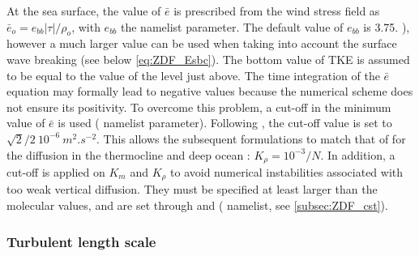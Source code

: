 \documentclass[../main/NEMO_manual]{subfiles}
\begin{document}
At the sea surface, the value of $\bar{e}$ is prescribed from the wind stress field as
$\bar{e}_o = e_{bb} |\tau| / \rho_o$, with $e_{bb}$ the  namelist parameter.
The default value of $e_{bb}$ is 3.75. \citep{gaspar.gregoris.ea_JGR90}), however a much larger value can be used when
taking into account the surface wave breaking (see below \autoref{eq:ZDF_Esbc}).
The bottom value of TKE is assumed to be equal to the value of the level just above.
The time integration of the $\bar{e}$ equation may formally lead to negative values because
the numerical scheme does not ensure its positivity.
To overcome this problem, a cut-off in the minimum value of $\bar{e}$ is used ( namelist parameter).
Following \citet{gaspar.gregoris.ea_JGR90}, the cut-off value is set to $\sqrt{2}/2~10^{-6}~m^2.s^{-2}$.
This allows the subsequent formulations to match that of \citet{gargett_JMR84} for the diffusion in
the thermocline and deep ocean :  $K_\rho = 10^{-3} / N$.
In addition, a cut-off is applied on $K_m$ and $K_\rho$ to avoid numerical instabilities associated with
too weak vertical diffusion.
They must be specified at least larger than the molecular values, and are set through  and
 ( namelist, see \autoref{subsec:ZDF_cst}).

\subsubsection{Turbulent length scale}
\end{document}
